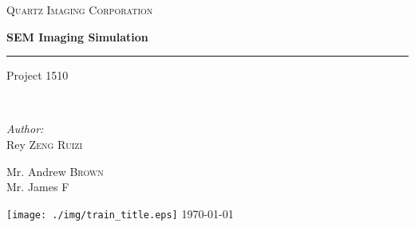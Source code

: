 \begin{titlepage}
\centering
\textsc{\LARGE Quartz Imaging Corporation}\\[0.5cm]
{ \huge \bfseries SEM Imaging Simulation\\[0.4cm] \hrule \vspace{0.4cm} \large Project 1510} \\[1em]

\begin{minipage}{0.4\textwidth}
\begin{flushleft} \large
\emph{Author:}\\
Rey \textsc{Zeng Ruizi} 
\end{flushleft}
\end{minipage}
\begin{minipage}{0.4\textwidth}
\begin{flushright} \large
Mr. Andrew \textsc{Brown}\\ [1em]
Mr. James \textsc{F}\\ [1em]

\end{flushright}
\end{minipage}
\vfill
\texttt{[image: ./img/train\_title.eps]}
\vfill
{\large \today}
\end{titlepage}
